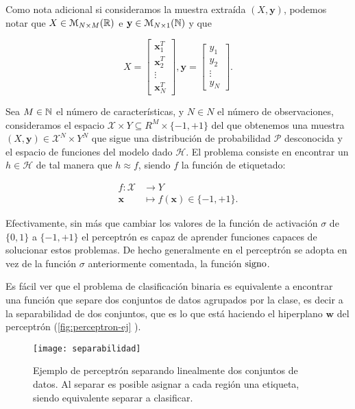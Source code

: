 Como nota adicional si consideramos la muestra extraída $(X, \textbf{y})$, podemos notar que $X \in \mathcal{M}_{N \times M}(\mathbb{R})$ e $\textbf{y} \in \mathcal{M}_{N \times 1}(\mathbb{N})$ y que

$$ X = \begin{bmatrix} \textbf{x}_1^T \\ \textbf{x}_2^T \\ \vdots \\ \textbf{x}_N^T \end{bmatrix}, \textbf{y} = \begin{bmatrix} y_1 \\ y_2 \\ \vdots \\ y_{N} \end{bmatrix}.$$

\begin{definicion}
  Sea $M \in \mathbb{N}$ el número de características, y $N \in N$ el número de observaciones, consideramos el espacio $\mathcal{X} \times Y \subseteq R^M \times \{-1, +1\}$ del que obtenemos una muestra $(X, \textbf{y}) \in \mathcal{X}^N \times Y^N$ que sigue una distribución de probabilidad $\mathcal{P}$ desconocida y el espacio de funciones del modelo dado $\mathcal{H}$. El problema consiste en encontrar un $h \in \mathcal{H}$ de tal manera que $h \approx f$, siendo $f$ la función de etiquetado:

  \begin{align*}
    f : \mathcal{X} & \to Y \\
    \textbf{x} & \mapsto f(\textbf{x}) \in \{-1, +1\}.
  \end{align*}
  \label{def:clasbin}
\end{definicion}

Efectivamente, sin más que cambiar los valores de la función de activación $\sigma$ de $\{0, 1\}$ a $\{-1, +1\}$ el perceptrón es capaz de aprender funciones capaces de solucionar estos problemas. De hecho generalmente en el perceptrón se adopta en vez de la función $\sigma$ anteriormente comentada, la función $\operatorname{signo}$.

Es fácil ver que el problema de clasificación binaria es equivalente a encontrar una función que separe dos conjuntos de datos agrupados por la clase, es decir a la separabilidad de dos conjuntos, que es lo que está haciendo el hiperplano $\textbf{w}$ del perceptrón (\autoref{fig:perceptron-ej} \cite{wikipedia2017separ}).

\begin{figure}[htpb]
  \centering
  \texttt{[image: separabilidad]}
  \caption{Ejemplo de perceptrón separando linealmente dos conjuntos de datos. Al separar es posible asignar a cada región una etiqueta, siendo equivalente separar a clasificar.}
  \label{fig:perceptron-ej}
\end{figure}


